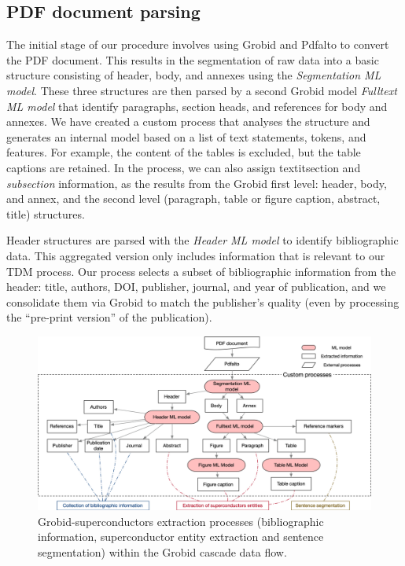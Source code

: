 \subsection{PDF document parsing}

The initial stage of our procedure involves using Grobid and Pdfalto to convert the PDF document. This results in the segmentation of raw data into a basic structure consisting of header, body, and annexes using the \emph{Segmentation ML model}.
These three structures are then parsed by a second Grobid model \emph{Fulltext ML model} that identify paragraphs, section heads, and references for body and annexes. 
We have created a custom process that analyses the structure and generates an internal model based on a list of text statements, tokens, and features. For example, the content of the tables is excluded, but the table captions are retained.
In the process, we can also assign textit{section} and \textit{subsection} information, as the results from the Grobid first level: header, body, and annex, and the second level (paragraph, table or figure caption, abstract, title) structures.

Header structures are parsed with the \emph{Header ML model} to identify bibliographic data. 
This aggregated version only includes information that is relevant to our TDM process. 
Our process selects a subset of bibliographic information from the header: title, authors, DOI, publisher, journal, and year of publication, and we consolidate them via Grobid to match the publisher's quality (even by processing the ``pre-print version'' of the publication).

\begin{figure}[htbp]
    \includegraphics[width=\textwidth]{figures/automatic_extraction_supercon/document-structuring-colors}
    \caption{Grobid-superconductors extraction processes (bibliographic information, superconductor entity extraction and sentence segmentation) within the Grobid cascade data flow.}
    \label{fig:grobid-document-processing}
\end{figure}


